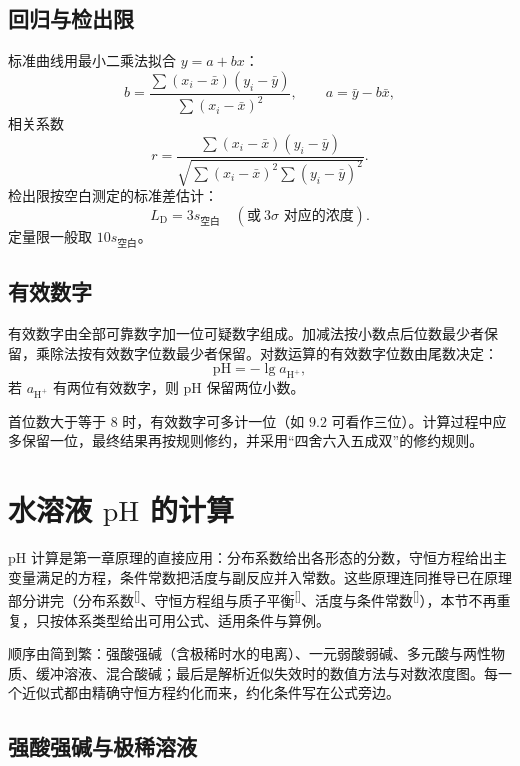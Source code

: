 \documentclass[UTF8]{ctexbook}
\begin{document}
\subsection{回归与检出限}

标准曲线用最小二乘法拟合 $y=a+bx$：
\[
b=\frac{\sum(x_i-\bar{x})(y_i-\bar{y})}{\sum(x_i-\bar{x})^2},
\qquad
a=\bar{y}-b\bar{x},
\]
相关系数
\[
r=\frac{\sum(x_i-\bar{x})(y_i-\bar{y})}
{\sqrt{\sum(x_i-\bar{x})^2\sum(y_i-\bar{y})^2}}.
\]
检出限按空白测定的标准差估计：
\[
L_{\mathrm{D}}=3s_{\text{空白}}\quad(\text{或}\ 3\sigma\text{ 对应的浓度}).
\]
定量限一般取 $10s_{\text{空白}}$。

\subsection{有效数字}

有效数字由全部可靠数字加一位可疑数字组成。加减法按小数点后位数最少者保留，乘除法按有效数字位数最少者保留。对数运算的有效数字位数由尾数决定：
\[
\mathrm{pH}=-\lg a_{\mathrm{H^+}},
\]
若 $a_{\mathrm{H^+}}$ 有两位有效数字，则 $\mathrm{pH}$ 保留两位小数。

首位数大于等于 8 时，有效数字可多计一位（如 $9.2$ 可看作三位）。计算过程中应多保留一位，最终结果再按规则修约，并采用“四舍六入五成双”的修约规则。

\newpage





\newpage
\section{水溶液 $\mathrm{pH}$ 的计算}

$\mathrm{pH}$ 计算是第一章原理的直接应用：分布系数给出各形态的分数，守恒方程给出主变量满足的方程，条件常数把活度与副反应并入常数。这些原理连同推导已在原理部分讲完（分布系数\textsuperscript{[\pageref{sec:delta}]}、守恒方程组与质子平衡\textsuperscript{[\pageref{sec:balance}]}、活度与条件常数\textsuperscript{[\pageref{sec:activity}]}），本节不再重复，只按体系类型给出可用公式、适用条件与算例。

顺序由简到繁：强酸强碱（含极稀时水的电离）、一元弱酸弱碱、多元酸与两性物质、缓冲溶液、混合酸碱；最后是解析近似失效时的数值方法与对数浓度图。每一个近似式都由精确守恒方程约化而来，约化条件写在公式旁边。

\subsection{强酸强碱与极稀溶液}
\end{document}
